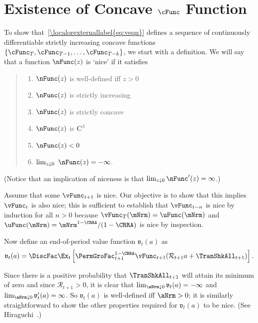 \documentclass[\econtexRoot/BufferStockTheory]{subfiles}
\begin{document}
\section{Existence of Concave \texorpdfstring{$\cFunc$}{c} Function}\label{sec:ApndxConcaveCFunc}

To show that~\eqref{\localorexternallabel{eq:veqn}} defines a sequence of continuously differentiable strictly increasing concave functions $\{\cFunc_{T},\cFunc_{T-1},\ldots,\cFunc_{T-k}\}$, we start with a definition.  We will say that a function $\nFunc(z)$ is `nice' if it satisfies
\begin{quote}
\begin{enumerate}\setlength{\itemsep}{0.0ex}
\item $\nFunc(z)$ is well-defined iff $z>0$

\item $\nFunc(z)$ is strictly increasing

\item $\nFunc(z)$ is strictly concave

\item $\nFunc(z)$ is $ \mathbf{C}^{3}$

\item $\nFunc(z)<0$

\item $\lim_{z\downarrow 0}~\nFunc(z) =-\infty $.

\end{enumerate}
\end{quote}


(Notice that an implication of niceness is that $\lim_{z \downarrow 0} \nFunc^{\prime}(z) = \infty$.)

Assume that some $\vFunc_{t+1}$ is nice.  Our objective is to show that this
implies $\vFunc_{t}$ is also nice; this is sufficient to establish that
$\vFunc_{t-n}$ is nice by induction for all $n > 0$ because $\vFunc_{T}(\mNrm)
=\uFunc(\mNrm) $ and $\uFunc(\mNrm)=\mNrm^{1-\CRRA}/(1-\CRRA)$ is nice by inspection.

\hypertarget{BoroCnstNat}{}
Now define an end-of-period value function $\mathfrak{v}_{t}(a) $ as
\begin{equation}
\mathfrak{v}_{t}(a) =\DiscFac \Ex_{t}\left[{\PermGroFac}_{t+1}^{1-\CRRA}\vFunc_{t+1}( {\mathcal{R}}_{t+1} a+{\TranShkAll}_{t+1}) \right]. \label{eq:vEnd}
\end{equation}

Since there is a positive probability that $\TranShkAll_{t+1}$ will
attain its minimum of zero and since $\mathcal{R}_{t+1}>0$, it
is clear that $\lim_{\aNrm \downarrow 0} \mathfrak{v}_{t}(a) = -\infty$
and $\lim_{\aNrm \downarrow 0} \mathfrak{v}^{\prime}_{t}(a) = \infty$.  So
$\mathfrak{v}_{t}(a) $ is well-defined iff $\aNrm>0$; it is similarly
straightforward to show the other properties required for $\mathfrak{v}_{t}(a) $ to
be nice.  (See Hiraguchi~\citeyearpar{hiraguchiBSProofs}.)
\end{document}
